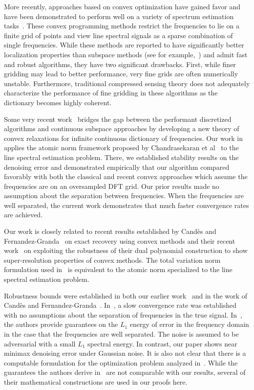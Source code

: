 More recently, approaches based on convex optimization have gained favor and
have been demonstrated to perform well on a variety of spectrum estimation
tasks~\cite{malioutov05,bourguignon2007irregular,baraniuk2010model,zweig2003irre
gular}. These convex programming methods restrict the frequencies to lie on a
finite grid of points and view line spectral signals as a sparse combination of
single frequencies. While these methods are reported to have significantly
better localization properties than subspace methods (see for
example,~\cite{malioutov05}) and admit fast and robust algorithms, they have
two significant drawbacks. First, while finer gridding may lead to better
performance, very fine grids are often numerically unstable. Furthermore,
traditional compressed sensing theory does not adequately characterize the
performance of fine gridding in these algorithms as the dictionary becomes
highly coherent.

Some very recent work~\cite{btr12,cg_exact12,cg_noisy} bridges the gap between
the performant discretized algorithms and continuous subspace approaches by
developing a new theory of convex relaxations for infinite continuous
dictionary of frequencies. Our work in~\cite{btr12} applies the atomic norm
framework proposed by Chandrasekaran et al~\cite{crpw} to the line spectral
estimation problem. There, we established stability results on the denoising
error and demonstrated empirically that our algorithm compared favorably with
both the classical and recent convex approaches which assume the frequencies
are on an oversampled DFT grid. Our prior results made no assumption about the
separation between frequencies. When the frequencies are well separated, the
current work demonstrates that much faster convergence rates are achieved.

Our work is closely related to recent results established by Cand\`es and
Fernandez-Granda~\cite{cg_exact12} on exact recovery using convex methods and
their recent work~\cite{cg_noisy} on exploiting the robustness of their dual
polynomial construction to show super-resolution properties of convex methods.
The total variation norm formulation used in~\cite{cg_noisy} is equivalent to
the atomic norm specialized to the line spectral estimation problem.

Robustness bounds were established in both our earlier work~\cite{btr12} and in
the work of Cand\`es and Fernandez-Granda~\cite{cg_noisy}. In~\cite{btr12}, a
slow convergence rate was established with no assumptions about the separation
of frequencies in the true signal. In~\cite{cg_noisy}, the authors provide
guarantees on the $L_1$ energy of error in the frequency domain in the case
that the frequencies are well separated. The noise is assumed to be adversarial
with a small $L_1$ spectral energy. In contrast, our paper shows near minimax
denoising error under Gaussian noise. It is also not clear that there is a
computable formulation for the optimization problem analyzed
in~\cite{cg_noisy}. While the guarantees the authors derive in~\cite{cg_noisy}
are not comparable with our results, several of their mathematical
constructions are used in our proofs here.

